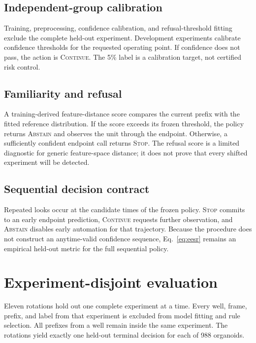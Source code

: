 \documentclass[11pt,twocolumn]{article}
\newcommand{\stopstate}{\textsc{Stop}\xspace}
\newcommand{\continuestate}{\textsc{Continue}\xspace}
\newcommand{\abstainstate}{\textsc{Abstain}\xspace}
\begin{document}
\subsection{Independent-group calibration}

Training, preprocessing, confidence calibration, and refusal-threshold fitting exclude the
complete held-out experiment. Development experiments calibrate confidence thresholds for the
requested operating point. If confidence does not pass, the action is \continuestate. The 5\%
label is a calibration target, not certified risk control.

\subsection{Familiarity and refusal}

A training-derived feature-distance score compares the current prefix with the fitted reference
distribution. If the score exceeds its frozen threshold, the policy returns \abstainstate and
observes the unit through the endpoint. Otherwise, a sufficiently confident endpoint call returns
\stopstate. The refusal score is a limited diagnostic for generic feature-space distance; it does
not prove that every shifted experiment will be detected.

\subsection{Sequential decision contract}

Repeated looks occur at the candidate times of the frozen policy. \stopstate commits to an early
endpoint prediction, \continuestate requests further observation, and \abstainstate disables early
automation for that trajectory. Because the procedure does not construct an anytime-valid
confidence sequence, Eq.~\eqref{eq:eesr} remains an empirical held-out metric for the full
sequential policy.

\section{Experiment-disjoint evaluation}

Eleven rotations hold out one complete experiment at a time. Every well, frame, prefix, and label
from that experiment is excluded from model fitting and rule selection. All prefixes from a well
remain inside the same experiment. The rotations yield exactly one held-out terminal decision for
each of 988 organoids.
\end{document}
